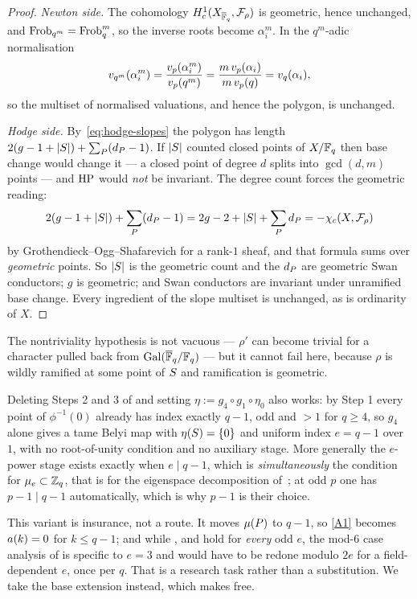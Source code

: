 \begin{proof}
\emph{Newton side.} The cohomology $H^1_c(X_{\overline{\mathbb{F}}_q}, \mathcal{F}_\rho)$ is
geometric, hence unchanged, and $\operatorname{Frob}_{q^m} = \operatorname{Frob}_q^m$, so the inverse
roots become $\alpha_i^m$. In the $q^m$-adic normalisation
\[
  v_{q^m}(\alpha_i^m) = \frac{v_p(\alpha_i^m)}{v_p(q^m)}
   = \frac{m\,v_p(\alpha_i)}{m\,v_p(q)} = v_q(\alpha_i),
\]
so the multiset of normalised valuations, and hence the polygon, is
unchanged.

\emph{Hodge side.} By~\eqref{eq:hodge-slopes} the polygon has length
$2(g-1+|S|) + \sum_P(d_P-1)$. If $|S|$ counted closed points of
$X/\mathbb{F}_q$ then base change would change it --- a closed point of degree $d$
splits into $\gcd(d,m)$ points --- and $\operatorname{HP}$ would \emph{not} be invariant.
The degree count forces the geometric reading:
\[
  2(g-1+|S|) + \sum_P(d_P - 1) = 2g-2+|S|+\sum_P d_P
  = -\chi_c(X, \mathcal{F}_\rho)
\]
by Grothendieck--Ogg--Shafarevich for a rank-$1$ sheaf, and that formula
sums over \emph{geometric} points. So $|S|$ is the geometric count and
the $d_P$ are geometric Swan conductors; $g$ is geometric; and Swan
conductors are invariant under unramified base change. Every ingredient of
the slope multiset is unchanged, as is ordinarity of $X$.
\end{proof}

The nontriviality hypothesis is not vacuous --- $\rho'$ can become trivial
for a character pulled back from $\operatorname{Gal}(\overline{\mathbb{F}}_q/\mathbb{F}_q)$ --- but it cannot fail
here, because $\rho$ is wildly ramified at some point of $S$ and
ramification is geometric.

\begin{remark}
\label{rem:eqminus1}
Deleting Steps 2 and 3 of  and setting $\eta := g_4 \circ
g_1 \circ \eta_0$ also works: by Step 1 every point of $\phi^{-1}(0)$
already has index exactly $q-1$, odd and $>1$ for $q \ge 4$, so $g_4$ alone
gives a tame Belyi map with $\eta(S) = \{0\}$ and uniform index $e =
q-1$ over $1$, with no root-of-unity condition and no auxiliary stage. More
generally the $e$-power stage exists exactly when $e \mid q-1$, which is
\emph{simultaneously} the condition for $\mu_e \subset \mathbb{Z}_q$, that is for
the eigenspace decomposition of~\cite[Definition 6.3]{kramermillerupton2021newton}; at odd $p$ one has $p-1 \mid q-1$
automatically, which is why $p-1$ is their choice.

This variant is insurance, not a route. It moves $\mu(P)$ to $q-1$, so
\ref{A1} becomes $a(k) = 0$ for $k \le q-1$; and while
,  and
 hold for \emph{every} odd $e$, the mod-$6$ case
analysis of  is specific to $e = 3$ and would have to be
redone modulo $2e$ for a field-dependent $e$, once per $q$. That is a
research task rather than a substitution. We take the base extension
instead, which  makes free.
\end{remark}
